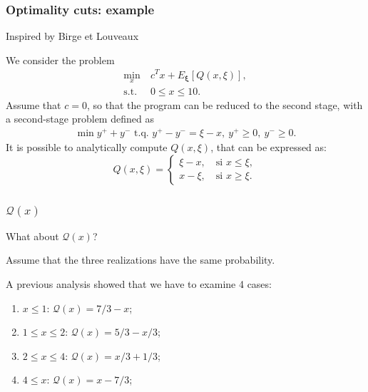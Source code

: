 \documentclass{beamer}
\def\bxi{\boldsymbol\xi}
\begin{document}


	
	

\begin{frame}
\frametitle{Optimality cuts: example}
	
{\red Inspired by Birge et Louveaux}
	
We consider the problem
\begin{align*}
\min_x\ & c^Tx + E_{\bxi} [ Q(x,\xi) ],\\
\mbox{s.t. } & 0 \leq x \leq 10.
\end{align*}
Assume that $c = 0$, so that the program can be reduced to the second stage, with a second-stage problem defined as
\begin{align*}
\min y^++y^- \mbox{ t.q. } y^+-y^- = \xi - x,\ y^+ \geq 0,\ y^- \geq 0.
\end{align*}
It is possible to analytically compute $Q(x,\xi)$, that can be expressed as:
\[
Q(x,\xi) =
\begin{cases}
\xi - x,\quad \mbox{si } x \leq \xi,\\
x - \xi,\quad \mbox{si } x \geq \xi.
\end{cases}
\]
	
\end{frame}

\begin{frame}
\frametitle{$\mathcal{Q}(x)$}
	
What about $\mathcal{Q}(x)$?
	
\mbox{}
	
Assume that the three realizations have the same probability.
	
\mbox{}
	
A previous analysis showed that we have to examine 4 cases:
\begin{enumerate}
\item
$x \leq 1$: $\mathcal{Q}(x) = 7/3 - x$;
\item
$1 \leq x \leq 2$: $\mathcal{Q}(x) = 5/3-x/3$;
\item
$2 \leq x \leq 4$: $\mathcal{Q}(x) = x/3+1/3$;
\item
$4 \leq x$: $\mathcal{Q}(x) = x-7/3$;
\end{enumerate}
	
\end{frame}
\end{document}
